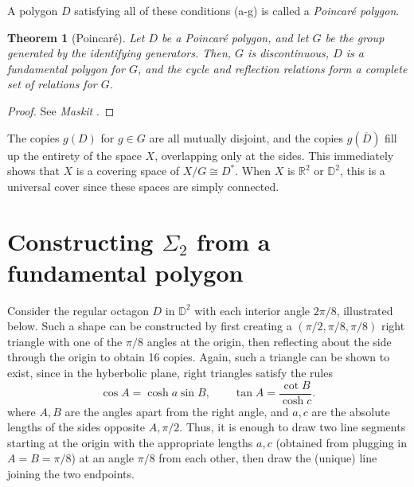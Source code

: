 \documentclass[12pt]{article}
\newcommand{\R}{\mathbb{R}}
\newtheorem{theorem}{Theorem}[section]
\theoremstyle{definition}
\theoremstyle{remark}
\begin{document}
    A polygon $D$ satisfying all of these conditions (a-g) is called a
    \emph{Poincar\'e polygon}.

    \begin{theorem}[Poincar\'e]
        Let $D$ be a Poincar\'e polygon, and let $G$ be the group generated by the
        identifying generators. Then, $G$ is discontinuous, $D$ is a fundamental
        polygon for $G$, and the cycle and reflection relations form a complete set
        of relations for $G$.
    \end{theorem}
    \begin{proof}
        See \emph{Maskit} \cite{maskit}.
    \end{proof}

    The copies $g(D)$ for $g \in G$ are all mutually disjoint, and the copies
    $g(\overline{D})$ fill up the entirety of the space $X$, overlapping only at the
    sides. This immediately shows that $X$ is a covering space of $X/G \cong D^*$.
    When $X$ is $\R^2$ or $\mathbb{D}^2$, this is a universal cover since these
    spaces are simply connected.


    \section{Constructing $\Sigma_2$ from a fundamental polygon}

    Consider the regular octagon $D$ in $\mathbb{D}^2$ with each interior angle $2\pi
    / 8$, illustrated below. Such a shape can be constructed by first creating a
    $(\pi / 2, \pi / 8, \pi / 8)$ right triangle with one of the $\pi / 8$ angles at
    the origin, then reflecting about the side through the origin to obtain 16
    copies.  Again, such a triangle can be shown to exist, since in the hyberbolic
    plane, right triangles satisfy the rules \[
        \cos{A} = \cosh{a} \sin{B}, \qquad
        \tan{A} = \frac{\cot{B}}{\cosh{c}}.
    \] where $A, B$ are the angles apart from the right angle, and $a, c$ are the
    absolute lengths of the sides opposite $A, \pi / 2$. Thus, it is enough to draw
    two line segments starting at the origin with the appropriate lengths $a, c$
    (obtained from plugging in $A = B = \pi / 8$) at an angle $\pi / 8$ from each
    other, then draw the (unique) line joining the two endpoints.
\end{document}
